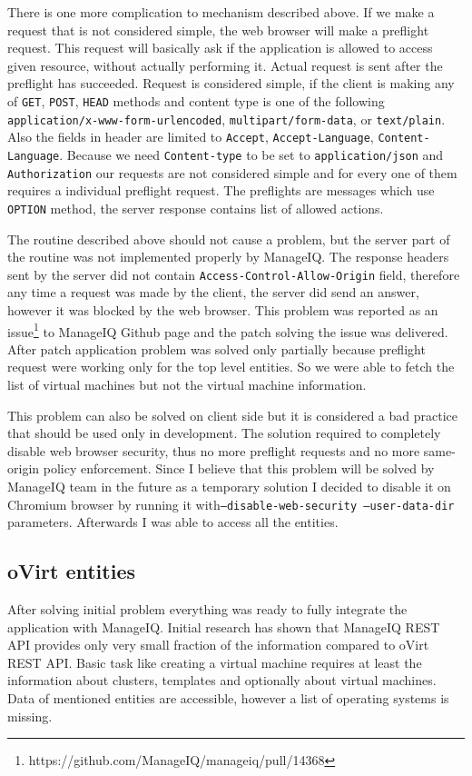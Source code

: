 There is one more complication to mechanism described above. If we make a request that is not considered simple, the web browser will make a preflight request. This request will basically ask if the application is allowed to access given resource, without actually performing it. Actual request is sent after the preflight has succeeded. Request is considered simple, if the client is making any of \texttt{GET}, \texttt{POST}, \texttt{HEAD} methods and content type is one of the following \texttt{application/x-www-form-urlencoded}, \texttt{multipart/form-data}, or \texttt{text/plain}. Also the fields in header are limited to \texttt{Accept}, \texttt{Accept-Language}, \texttt{Content-Language}. Because we need \texttt{Content-type} to be set to \texttt{application/json} and \texttt{Authorization} our requests are not considered simple and for every one of them requires a individual preflight request. The preflights are messages which use \texttt{OPTION} method, the server response contains list of allowed actions.

The routine described above should not cause a problem, but the server part of the routine was not implemented properly by ManageIQ. The response headers sent by the server did not contain \texttt{Access-Control-Allow-Origin} field, therefore any time a request was made by the client, the server did send an answer, however it was blocked by the web browser. This problem was reported as an issue\footnote{https://github.com/ManageIQ/manageiq/pull/14368} to ManageIQ Github page and the patch solving the issue was delivered. After patch application problem was solved only partially because preflight request were working only for the top level entities. So we were able to fetch the list of virtual machines but not the virtual machine information.

This problem can also be solved on client side but it is considered a bad practice that should be used only in development. The solution required to completely disable web browser security, thus no more preflight requests and no more same-origin policy enforcement. Since I believe that this problem will be solved by ManageIQ team in the future as a temporary solution I decided to disable it on Chromium browser by running it with\texttt{--disable-web-security --user-data-dir} parameters. Afterwards I was able to access all the entities.

\subsection{oVirt entities}
After solving initial problem everything was ready to fully integrate the application with ManageIQ. Initial research has shown that ManageIQ REST API provides only very small fraction of the information compared to oVirt REST API.
Basic task like creating a virtual machine requires at least the information about clusters, templates and optionally about virtual machines. Data of mentioned entities are accessible, however a list of operating systems is missing. 

